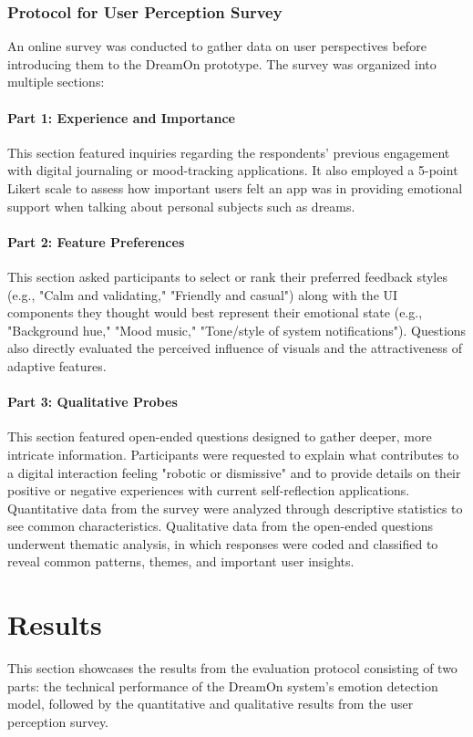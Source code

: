 \documentclass[conference]{IEEEtran}
\begin{document}
	\subsubsection{Protocol for User Perception Survey}
	An online survey was conducted to gather data on user perspectives before introducing them to the DreamOn prototype. The survey was organized into multiple sections:
	\paragraph{Part 1: Experience and Importance} This section featured inquiries regarding the respondents’ previous engagement with digital journaling or mood-tracking applications. It also employed a 5-point Likert scale to assess how important users felt an app was in providing emotional support when talking about personal subjects such as dreams.
	\paragraph{Part 2: Feature Preferences} This section asked participants to select or rank their preferred feedback styles (e.g., "Calm and validating," "Friendly and casual") along with the UI components they thought would best represent their emotional state (e.g., "Background hue," "Mood music," "Tone/style of system notifications"). Questions also directly evaluated the perceived influence of visuals and the attractiveness of adaptive features.
	\paragraph{Part 3: Qualitative Probes} This section featured open-ended questions designed to gather deeper, more intricate information. Participants were requested to explain what contributes to a digital interaction feeling "robotic or dismissive" and to provide details on their positive or negative experiences with current self-reflection applications.
	Quantitative data from the survey were analyzed through descriptive statistics to see common characteristics. Qualitative data from the open-ended questions underwent thematic analysis, in which responses were coded and classified to reveal common patterns, themes, and important user insights.
	
	\section{Results}
	This section showcases the results from the evaluation protocol consisting of two parts: the technical performance of the DreamOn system's emotion detection model, followed by the quantitative and qualitative results from the user perception survey.
	
\end{document}
